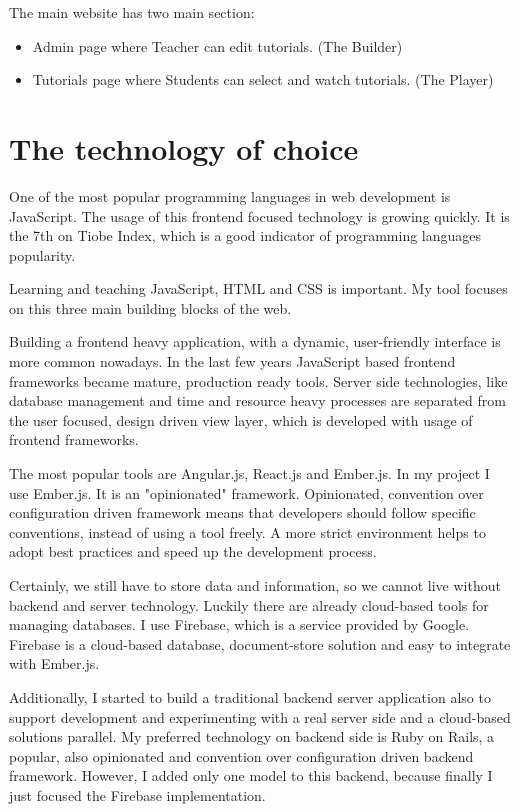 \documentclass[12pt, a4paper, oneside, openright, medskipamount]{report}
\begin{document}
\noindent The main website has two main section:
\begin{itemize}[noitemsep]
\item Admin page where Teacher can edit tutorials. (The Builder)
\item Tutorials page where Students can select and watch tutorials. (The Player)
\end{itemize}

\section{The technology of choice}

One of the most popular programming languages in web development is JavaScript. The usage of this frontend focused technology is growing quickly.  It is the 7th on Tiobe Index, which is a good indicator of programming languages popularity. \cite{tiobe}

Learning and teaching JavaScript, HTML and CSS is important. My tool focuses on this three main building blocks of the web.

Building a frontend heavy application, with a dynamic, user-friendly interface is more common nowadays. In the last few years JavaScript based frontend frameworks became mature, production ready tools. Server side technologies, like database management and time and resource heavy processes are separated from the user focused, design driven view layer, which is developed with usage of frontend frameworks.

The most popular tools are Angular.js, React.js and Ember.js. In my project I use Ember.js. It is an "opinionated" framework. Opinionated, convention over configuration driven framework means that developers should follow specific conventions, instead of using a tool freely. A more strict environment helps to adopt best practices and speed up the development process.

Certainly, we still have to store data and information, so we cannot live without backend and server technology. Luckily there are already cloud-based tools for managing databases. I use Firebase, which is a service provided by Google. Firebase is a cloud-based database, document-store solution and easy to integrate with Ember.js.

Additionally, I started to build a traditional backend server application also to support development and experimenting with a real server side and a cloud-based solutions parallel. My preferred technology on backend side is Ruby on Rails, a popular, also opinionated and convention over configuration driven backend framework. However, I added only one model to this backend, because finally I just focused the Firebase implementation.
\end{document}
